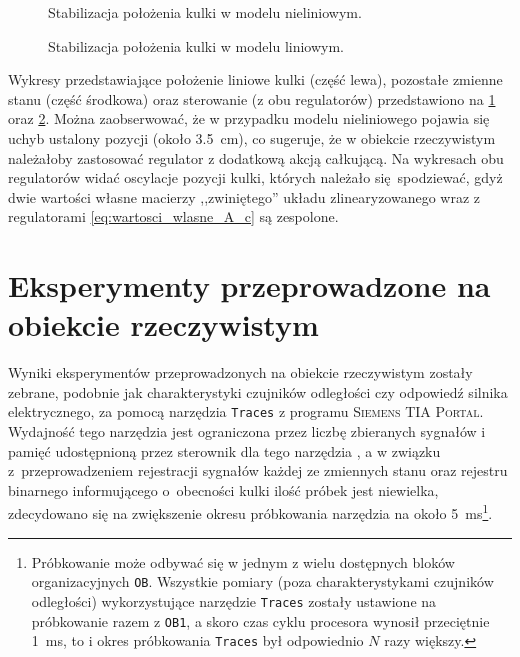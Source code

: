 \begin{figure}[h]
    
    \caption{Stabilizacja położenia kulki w modelu nieliniowym.}
    \label{fig:stabilizacja_modelu_nieliniowego}
\end{figure}

\begin{figure}[h]
    
    \caption{Stabilizacja położenia kulki w modelu liniowym.}
    \label{fig:stabilizacja_modelu_liniowego}
\end{figure}

Wykresy przedstawiające położenie liniowe kulki (część lewa), pozostałe zmienne stanu (część środkowa) oraz sterowanie (z obu regulatorów) przedstawiono na \cref{fig:stabilizacja_modelu_nieliniowego} oraz \cref{fig:stabilizacja_modelu_liniowego}. Można zaobserwować, że w przypadku modelu nieliniowego pojawia się uchyb ustalony pozycji (około \SI{3,5}{\centi\meter}), co sugeruje, że w obiekcie rzeczywistym należałoby zastosować regulator z dodatkową akcją całkującą. Na wykresach obu regulatorów widać oscylacje pozycji kulki, których należało się spodziewać, gdyż dwie wartości własne macierzy ,,zwiniętego'' układu zlinearyzowanego wraz z regulatorami \eqref{eq:wartosci_wlasne_A_c} są zespolone.

\section{Eksperymenty przeprowadzone na obiekcie rzeczywistym}
\label{sec:ch9_eksperymenty}

Wyniki eksperymentów przeprowadzonych na obiekcie rzeczywistym zostały zebrane, podobnie jak charakterystyki czujników odległości czy odpowiedź silnika elektrycznego, za pomocą narzędzia \texttt{Traces} z programu \textsc{Siemens TIA Portal}. Wydajność tego narzędzia jest ograniczona przez liczbę zbieranych sygnałów i pamięć udostępnioną przez sterownik dla tego narzędzia \cite{SIEMENSTRACE}, a w związku z~przeprowadzeniem rejestracji sygnałów każdej ze zmiennych stanu oraz rejestru binarnego informującego o~obecności kulki ilość próbek jest niewielka, zdecydowano się na zwiększenie okresu próbkowania narzędzia na około \SI{5}{\milli\second}\footnote{Próbkowanie może odbywać się w jednym z wielu dostępnych bloków organizacyjnych \texttt{OB}. Wszystkie pomiary (poza charakterystykami czujników odległości) wykorzystujące narzędzie \texttt{Traces} zostały ustawione na próbkowanie razem z \texttt{OB1}, a skoro czas cyklu procesora wynosił przeciętnie \SI{1}{\milli\second}, to i okres próbkowania \texttt{Traces} był odpowiednio $N$ razy większy.}.

